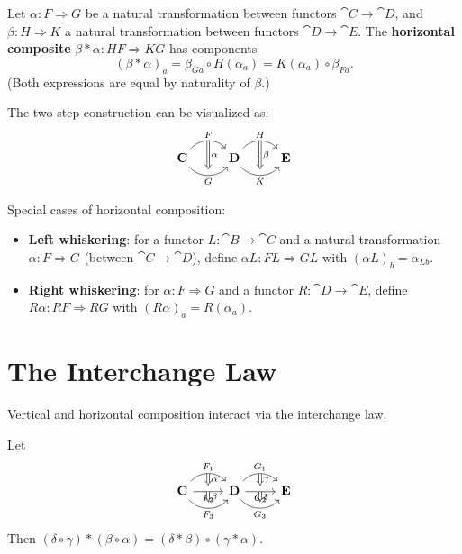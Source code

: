 \begin{definition}
Let $\alpha: F \Rightarrow G$ be a natural transformation between functors $\cat{C} \to \cat{D}$, and $\beta: H \Rightarrow K$ a natural transformation between functors $\cat{D} \to \cat{E}$. The \textbf{horizontal composite} $\beta * \alpha: HF \Rightarrow KG$ has components
\[
  (\beta * \alpha)_a = \beta_{Ga} \circ H(\alpha_a) = K(\alpha_a) \circ \beta_{Fa}.
\]
(Both expressions are equal by naturality of $\beta$.)
\end{definition}

The two-step construction can be visualized as:
\[
  \begin{tikzcd}
    \cat{C} \ar[r, bend left=50, "F", ""{name=F}]
            \ar[r, bend right=50, "G"', ""{name=G}] &
    \cat{D} \ar[r, bend left=50, "H", ""{name=H}]
            \ar[r, bend right=50, "K"', ""{name=K}] &
    \cat{E}
    \ar[Rightarrow, from=F, to=G, "\alpha"]
    \ar[Rightarrow, from=H, to=K, "\beta"]
  \end{tikzcd}
\]

\begin{definition}[Whiskering]
Special cases of horizontal composition:
\begin{itemize}
  \item \textbf{Left whiskering}: for a functor $L: \cat{B} \to \cat{C}$ and a natural transformation $\alpha: F \Rightarrow G$ (between $\cat{C} \to \cat{D}$), define $\alpha L: FL \Rightarrow GL$ with $(\alpha L)_b = \alpha_{Lb}$.
  \item \textbf{Right whiskering}: for $\alpha: F \Rightarrow G$ and a functor $R: \cat{D} \to \cat{E}$, define $R\alpha: RF \Rightarrow RG$ with $(R\alpha)_a = R(\alpha_a)$.
\end{itemize}
\end{definition}

\section{The Interchange Law}

Vertical and horizontal composition interact via the interchange law.

\begin{theorem}
Let
\[
  \begin{tikzcd}
    \cat{C} \ar[r, bend left=50, "F_1", ""{name=F1}]
            \ar[r, "F_2"', ""{name=F2, above}]
            \ar[r, bend right=50, "F_3"', ""{name=F3}] &
    \cat{D} \ar[r, bend left=50, "G_1", ""{name=G1}]
            \ar[r, "G_2"', ""{name=G2, above}]
            \ar[r, bend right=50, "G_3"', ""{name=G3}] &
    \cat{E}
    \ar[Rightarrow, from=F1, to=F2, "\alpha"]
    \ar[Rightarrow, from=F2, to=F3, "\beta"]
    \ar[Rightarrow, from=G1, to=G2, "\gamma"]
    \ar[Rightarrow, from=G2, to=G3, "\delta"]
  \end{tikzcd}
\]
Then $(\delta \circ \gamma) * (\beta \circ \alpha) = (\delta * \beta) \circ (\gamma * \alpha)$.
\end{theorem}

